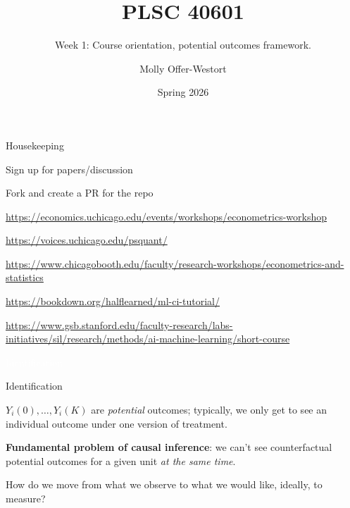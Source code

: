 \documentclass[xcolor={dvipsnames},handout]{beamer}
\title{PLSC 40601}
\subtitle{Week 1: Course orientation, potential outcomes framework.}
\date{Spring 2026}
\author{Molly Offer-Westort}
\institute{Department of Political Science, \\University of Chicago}
\begin{document}


\frame{\titlepage
\thispagestyle{empty}
}
\begin{frame}{Housekeeping}

\pause
\begin{wideitemize}
\item Sign up for papers/discussion\pause
\item Fork and create a PR for the repo\pause
\item \url{https://economics.uchicago.edu/events/workshops/econometrics-workshop} 
\item \url{https://voices.uchicago.edu/psquant/}
\item \url{https://www.chicagobooth.edu/faculty/research-workshops/econometrics-and-statistics}\pause
\item \url{https://bookdown.org/halflearned/ml-ci-tutorial/}
\item \url{https://www.gsb.stanford.edu/faculty-research/labs-initiatives/sil/research/methods/ai-machine-learning/short-course}
\end{wideitemize}

\end{frame}



\begin{transitionframe}
\centering

\LARGE \textcolor{white}{Identification.}

\end{transitionframe}
\begin{frame}{Identification}

\begin{wideitemize}
\item $Y_i(0), \dots, Y_i(K)$ are \textit{potential} outcomes\pause; typically, we only get to see an individual outcome under one version of treatment. \pause
\item \textbf{Fundamental problem of causal inference}: we can't see counterfactual potential outcomes for a given unit \textit{at the same time}.\pause
\item How do we move from what we observe to what we would like, ideally, to measure? 
\end{wideitemize}

\end{frame}
\end{document}
